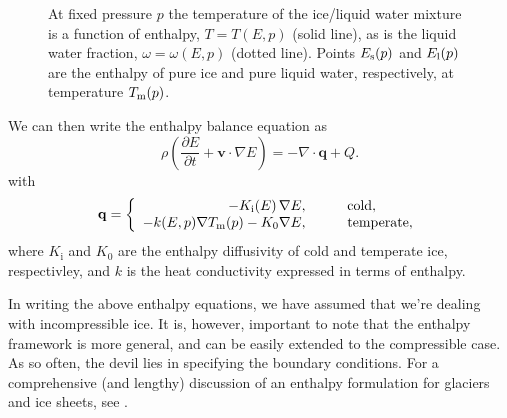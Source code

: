 \documentclass[parskip=half]{scrartcl}
\newcommand{\bq}{\mathbf{q}}
\newcommand{\bv}{\mathbf{v}}
\newcommand{\ddt}[1]{\ensuremath{\frac{\partial #1}{\partial t}}}
\newcommand{\Div}{\nabla\cdot}
\newcommand{\grad}{\nabla}
\begin{document}
\begin{figure}
  \centering{
    
  }
  \caption{At fixed pressure $p$ the temperature of the ice/liquid water mixture is a function of enthalpy, $T=T(E,p)$ (solid line), as is the liquid water fraction, $\omega=\omega(E,p)$ (dotted line).  Points $E_{\text s}(p)$ and $E_{\text l}(p)$ are the enthalpy of pure ice and pure liquid water, respectively, at temperature $T_{\text m}(p)$.}
  \label{fig:enthalpy-function}
\end{figure}

We can then write the enthalpy balance equation as
\begin{equation}
  \label{eq:energy-balance} \rho \left(\ddt{E} + \bv \cdot
\grad E\right) = - \Div \bq + Q.
\end{equation}
with
\begin{equation}\label{eq:enthalpy-flux}
  {\mathbf q} = \left\{
    \begin{array}{rl}
      - K_{\text i}(E)\, \nabla E, & \qquad \text{cold},\\
      - k(E,p) \nabla T_{\text m}(p) - K_0 \nabla E, & \qquad \text{temperate},
    \end{array} 
  \right.
\end{equation} where $K_{\text{i}}$ and $K_0$ are the enthalpy diffusivity of cold and temperate ice, respectivley, and $k$ is the heat conductivity expressed in terms of enthalpy.

In writing the above enthalpy equations, we have assumed that we're dealing with incompressible ice. It is, however, important to note that the enthalpy framework is more general, and can be easily extended to the compressible case. As so often, the devil lies in specifying the boundary conditions. For a comprehensive (and lengthy) discussion of an enthalpy formulation for glaciers and ice sheets, see \cite{Aschwanden2012}.


\newpage 
\end{document}

